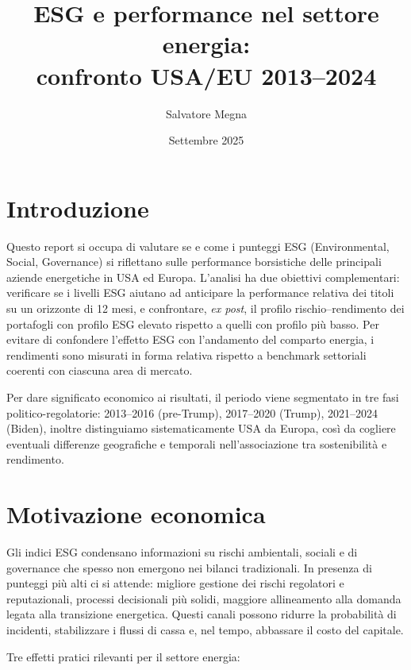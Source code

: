 \documentclass[12pt,a4paper]{article}
\title{
    \textbf{
        ESG e performance nel settore energia:\\
        confronto USA/EU 2013--2024
    }
}
\author{Salvatore Megna}
\date{Settembre 2025}
\begin{document}
\maketitle

\section{Introduzione}

Questo report si occupa di valutare se e come i punteggi ESG (Environmental, Social, Governance) si riflettano sulle performance borsistiche delle principali aziende energetiche in USA ed Europa. L'analisi ha due obiettivi complementari: verificare se i livelli ESG aiutano ad anticipare la performance relativa dei titoli su un orizzonte di 12 mesi, e confrontare, \textit{ex post}, il profilo rischio--rendimento dei portafogli con profilo ESG elevato rispetto a quelli con profilo più basso. Per evitare di confondere l'effetto ESG con l'andamento del comparto energia, i rendimenti sono misurati in forma relativa rispetto a benchmark settoriali coerenti con ciascuna area di mercato.

Per dare significato economico ai risultati, il periodo viene segmentato in tre fasi politico-regolatorie: 2013--2016 (pre-Trump), 2017--2020 (Trump), 2021--2024 (Biden), inoltre distinguiamo sistematicamente USA da Europa, così da cogliere eventuali differenze geografiche e temporali nell'associazione tra sostenibilità e rendimento.

\section{Motivazione economica}

Gli indici ESG condensano informazioni su rischi ambientali, sociali e di governance che spesso non emergono nei bilanci tradizionali. In presenza di punteggi più alti ci si attende: migliore gestione dei rischi regolatori e reputazionali, processi decisionali più solidi, maggiore allineamento alla domanda legata alla transizione energetica. Questi canali possono ridurre la probabilità di incidenti, stabilizzare i flussi di cassa e, nel tempo, abbassare il costo del capitale.

Tre effetti pratici rilevanti per il settore energia:
\end{document}
